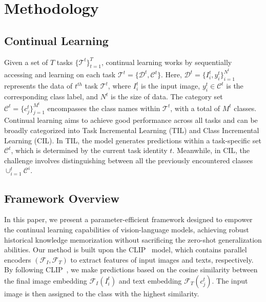 

\section{Methodology}



\subsection{Continual Learning}
Given a set of $T$ tasks $\{{\mathcal{T}^t}\}_{t=1}^{T}$, continual learning works by sequentially accessing and learning on each task $\mathcal{T}^t=\{\mathcal{D}^t,\mathcal{C}^t\}$. Here, $\mathcal{D}^t=\{{I}^{t}_i,{y}^{t}_i\}_{i=1}^{N^t}$ represents the data of $t^{th}$ task $\mathcal{T}^t$, where $I^{t}_{i}$ is the input image, $y^{t}_{i} \in \mathcal{C}^t$ is the corresponding class label, and $N^t$ is the size of data. The category set $\mathcal{C}^t=\{c^{t}_j\}_{j=1}^{M^t}$ encompasses the class names within $\mathcal{T}^t$, with a total of $M^t$ classes.
Continual learning aims to achieve good performance across all tasks and can be broadly categorized into Task Incremental Learning (TIL) and Class Incremental Learning (CIL).  In TIL, the model generates predictions within a task-specific set $\mathcal{C}^t$, which is determined by the current task identity $t$. Meanwhile, in CIL, the challenge involves distinguishing between all the previously encountered classes $\cup_{i=1}^t \mathcal{C}^i$.




\subsection{Framework Overview}


In this paper, we present a parameter-efficient framework designed to empower the continual learning capabilities of vision-language models, achieving robust historical knowledge memorization without sacrificing the  zero-shot generalization abilities. Our method is built upon the CLIP~\cite{gao2023clip} model, which contains parallel encoders $(\mathcal{F}_I,\mathcal{F}_T)$ to extract features of input images and texts, respectively. By following  CLIP~\cite{gao2023clip}, we make predictions based on the cosine similarity between the final image embedding $\mathcal{F}_I(I_i^t)$ and text embedding $\mathcal{F}_T(c^{t}_{j})$. The input image is then assigned to the class with the highest similarity.





